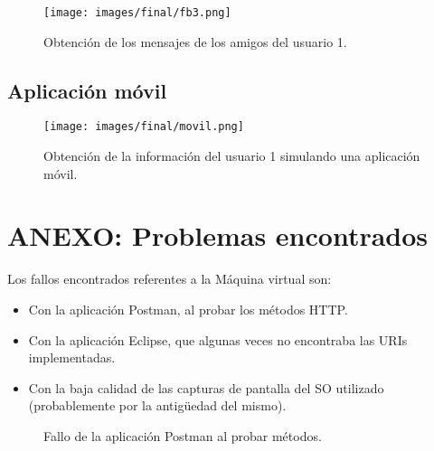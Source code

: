 \documentclass[12pt,a4paper, spanish]{article}
\begin{document}
\begin{figure}[H]
	\centering
	\texttt{[image: images/final/fb3.png]}
	\caption{Obtención de los mensajes de los amigos del usuario 1.}
\end{figure}

\subsection{Aplicación móvil}
\begin{figure}[H]
	\centering
	\texttt{[image: images/final/movil.png]}
	\caption{Obtención de la información del usuario 1 simulando una aplicación móvil.}
\end{figure}
\newpage
\section{ANEXO: Problemas encontrados}

Los fallos encontrados referentes a la Máquina virtual son:

\begin{itemize}
	\item Con la aplicación Postman, al probar los métodos HTTP.
	\item Con la aplicación Eclipse, que algunas veces no encontraba las URIs implementadas.
	\item Con la baja calidad de las capturas de pantalla del SO utilizado (probablemente por la antigüedad del mismo).
\end{itemize} 

\begin{figure}[H]
	\centering
	\caption{Fallo de la aplicación Postman al probar métodos.}
\end{figure}
\end{document}
